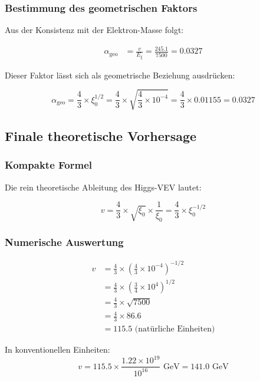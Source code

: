 \documentclass[12pt,a4paper]{article}
\begin{document}
\subsubsection{Bestimmung des geometrischen Faktors}

Aus der Konsistenz mit der Elektron-Masse folgt:

\begin{align}
	\alpha_{\text{geo}} &= \frac{v}{E_\xi} = \frac{245.1}{7500} = 0.0327
\end{align}

Dieser Faktor lässt sich als geometrische Beziehung ausdrücken:

\begin{equation}
	\alpha_{\text{geo}} = \frac{4}{3} \times \xi_0^{1/2} = \frac{4}{3} \times \sqrt{\frac{4}{3} \times 10^{-4}} = \frac{4}{3} \times 0.01155 = 0.0327
\end{equation}

\subsection{Finale theoretische Vorhersage}

\subsubsection{Kompakte Formel}

Die rein theoretische Ableitung des Higgs-VEV lautet:

\begin{equation}
	\boxed{v = \frac{4}{3} \times \sqrt{\xi_0} \times \frac{1}{\xi_0} = \frac{4}{3} \times \xi_0^{-1/2}}
\end{equation}

\subsubsection{Numerische Auswertung}

\begin{align}
	v &= \frac{4}{3} \times \left(\frac{4}{3} \times 10^{-4}\right)^{-1/2}\\
	&= \frac{4}{3} \times \left(\frac{3}{4} \times 10^{4}\right)^{1/2}\\
	&= \frac{4}{3} \times \sqrt{7500}\\
	&= \frac{4}{3} \times 86.6\\
	&= 115.5 \text{ (natürliche Einheiten)}
\end{align}

In konventionellen Einheiten:
\begin{equation}
	v = 115.5 \times \frac{1.22 \times 10^{19}}{10^{16}} \text{ GeV} = 141.0 \text{ GeV}
\end{equation}
\end{document}
